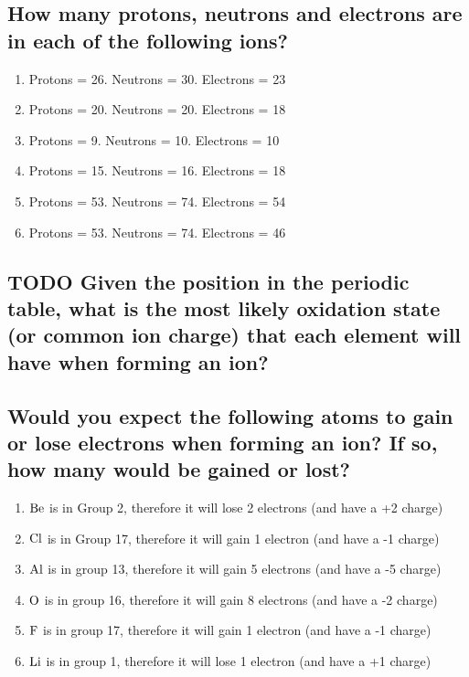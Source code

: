 \documentclass[11pt]{article}
\begin{document}
\subsection{How many protons, neutrons and electrons are in each of the following ions?}
\label{sec:org13a51c6}
\begin{enumerate}
\item Protons = 26. Neutrons = 30. Electrons = 23
\item Protons = 20. Neutrons = 20. Electrons = 18
\item Protons = 9. Neutrons = 10. Electrons = 10
\item Protons = 15. Neutrons = 16. Electrons = 18
\item Protons = 53. Neutrons = 74. Electrons = 54
\item Protons = 53. Neutrons = 74. Electrons = 46
\end{enumerate}

\subsection{{\bfseries\sffamily TODO} Given the position in the periodic table, what is the most likely oxidation state (or common ion charge) that each element will have when forming an ion?}
\label{sec:orgd8c4bf8}

\subsection{Would you expect the following atoms to gain or lose electrons when forming an ion? If so, how many would be gained or lost?}
\label{sec:org1def4ac}
\begin{enumerate}
\item \(\ce{Be}\) is in Group 2, therefore it will lose 2 electrons (and have a +2 charge)
\item \(\ce{Cl}\) is in Group 17, therefore it will gain 1 electron (and have a -1 charge)
\item \(\ce{Al}\) is in group 13, therefore it will gain 5 electrons (and have a -5 charge)
\item \(\ce{O}\) is in group 16, therefore it will gain 8 electrons (and have a -2 charge)
\item \(\ce{F}\) is in group 17, therefore it will gain 1 electron (and have a -1 charge)
\item \(\ce{Li}\) is in group 1, therefore it will lose 1 electron (and have a +1 charge)
\end{enumerate}
\end{document}
